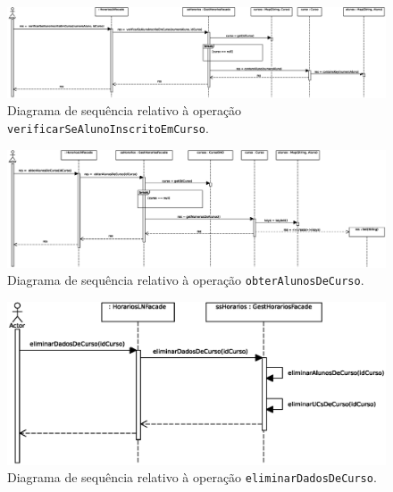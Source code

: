 \documentclass[12pt, a4paper]{article}
\begin{document}
\begin{landscape}
        \vspace*{\fill}
        \pagebreak
        \vspace*{\fill}

        \begin{figure}[H]
            \centering
            \includegraphics[scale=0.65]{Imagens/Modelos/verificarSeAlunoInscritoEmCurso.svg.eps}
            \caption{
                Diagrama de sequência relativo à operação \texttt{verificarSeAlunoInscritoEmCurso}.
            }
        \end{figure}

        \vspace*{\fill}
        \pagebreak
        \vspace*{\fill}

        \begin{figure}[H]
            \centering
            \includegraphics[scale=0.70]{Imagens/Modelos/obterAlunosDeCurso.svg.eps}
            \caption{
                Diagrama de sequência relativo à operação \texttt{obterAlunosDeCurso}.
            }
        \end{figure}

        \vspace*{\fill}
        \pagebreak
        \vspace*{\fill}

        \begin{figure}[H]
            \centering
            \includegraphics[scale=1.0]{Imagens/Modelos/eliminarDadosDeCurso.svg.eps}
            \caption{
                Diagrama de sequência relativo à operação \texttt{eliminarDadosDeCurso}.
            }
        \end{figure}


\end{landscape}
\end{document}
